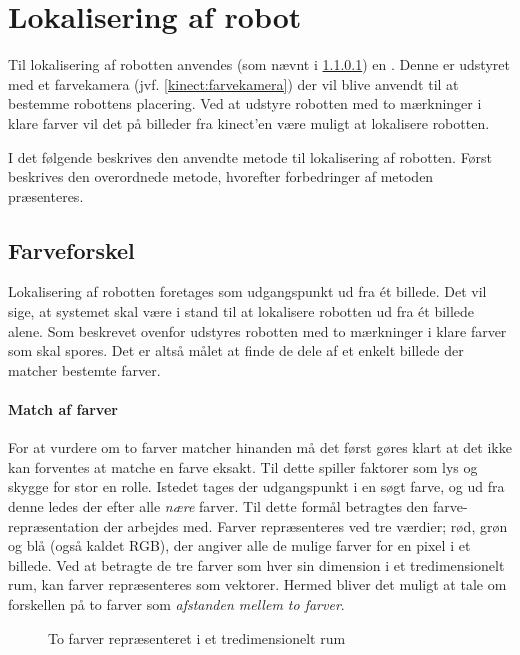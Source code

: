 \section{Lokalisering af robot}
Til lokalisering af robotten anvendes (som nævnt i \cref{}) en \kinect.
Denne er udstyret med et farvekamera (jvf. \cref{kinect:farvekamera}) der vil blive anvendt til at bestemme robottens placering.
Ved at udstyre robotten med to mærkninger i klare farver vil det på billeder fra kinect'en være muligt at lokalisere robotten.

I det følgende beskrives den anvendte metode til lokalisering af robotten.
Først beskrives den overordnede metode, hvorefter forbedringer af metoden præsenteres.

\subsection{Farveforskel}\label{tracking:colordiff}
Lokalisering af robotten foretages som udgangspunkt ud fra \'et billede.
Det vil sige, at systemet skal være i stand til at lokalisere robotten ud fra \'et billede alene.
Som beskrevet ovenfor udstyres robotten med to mærkninger i klare farver som skal spores.
Det er altså målet at finde de dele af et enkelt billede der matcher bestemte farver.

\paragraph{Match af farver}
For at vurdere om to farver matcher hinanden må det først gøres klart at det ikke kan forventes at matche en farve eksakt.
Til dette spiller faktorer som lys og skygge for stor en rolle.
Istedet tages der udgangspunkt i en søgt farve, og ud fra denne ledes der efter alle \textit{nære} farver.
Til dette formål betragtes den farve-repræsentation der arbejdes med.
Farver repræsenteres ved tre værdier; rød, grøn og blå (også kaldet RGB), der angiver alle de mulige farver for en pixel i et billede.
Ved at betragte de tre farver som hver sin dimension i et tredimensionelt rum, kan farver repræsenteres som vektorer.
Hermed bliver det muligt at tale om forskellen på to farver som \textit{afstanden mellem to farver}.

\begin{figure}
\centering

\caption{To farver repræsenteret i et tredimensionelt rum}
\label{tracking:colorspace}
\end{figure}

